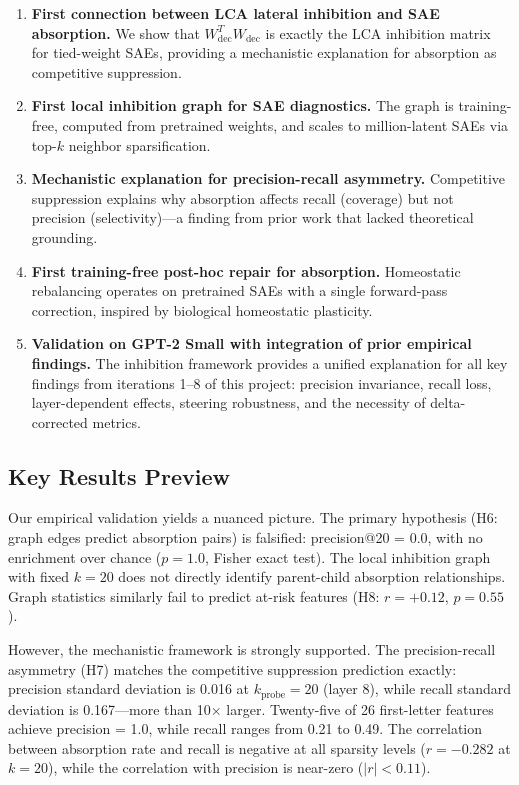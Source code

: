 \documentclass{article}
\begin{document}
\begin{enumerate}
\item \textbf{First connection between LCA lateral inhibition and SAE absorption.} We show that $W_{\text{dec}}^T W_{\text{dec}}$ is exactly the LCA inhibition matrix for tied-weight SAEs, providing a mechanistic explanation for absorption as competitive suppression.

\item \textbf{First local inhibition graph for SAE diagnostics.} The graph is training-free, computed from pretrained weights, and scales to million-latent SAEs via top-$k$ neighbor sparsification.

\item \textbf{Mechanistic explanation for precision-recall asymmetry.} Competitive suppression explains why absorption affects recall (coverage) but not precision (selectivity)---a finding from prior work that lacked theoretical grounding.

\item \textbf{First training-free post-hoc repair for absorption.} Homeostatic rebalancing operates on pretrained SAEs with a single forward-pass correction, inspired by biological homeostatic plasticity.

\item \textbf{Validation on GPT-2 Small with integration of prior empirical findings.} The inhibition framework provides a unified explanation for all key findings from iterations 1--8 of this project: precision invariance, recall loss, layer-dependent effects, steering robustness, and the necessity of delta-corrected metrics.
\end{enumerate}

\subsection{Key Results Preview}

Our empirical validation yields a nuanced picture. The primary hypothesis (H6: graph edges predict absorption pairs) is falsified: precision@20 = 0.0, with no enrichment over chance ($p = 1.0$, Fisher exact test). The local inhibition graph with fixed $k = 20$ does not directly identify parent-child absorption relationships. Graph statistics similarly fail to predict at-risk features (H8: $r = +0.12$, $p = 0.55$).

However, the mechanistic framework is strongly supported. The precision-recall asymmetry (H7) matches the competitive suppression prediction exactly: precision standard deviation is 0.016 at $k_{\text{probe}} = 20$ (layer 8), while recall standard deviation is 0.167---more than 10$\times$ larger. Twenty-five of 26 first-letter features achieve precision = 1.0, while recall ranges from 0.21 to 0.49. The correlation between absorption rate and recall is negative at all sparsity levels ($r = -0.282$ at $k = 20$), while the correlation with precision is near-zero ($|r| < 0.11$).
\end{document}
